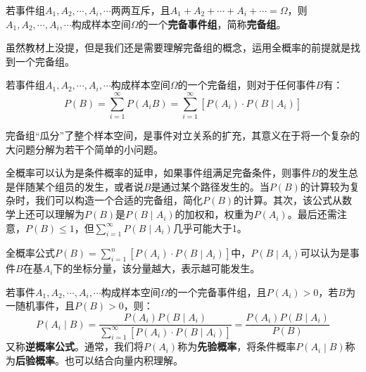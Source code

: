 \begin{definition}[完备事件组]
若事件组$A_1,A_2,\cdots ,A_i,\cdots $两两互斥，且$A_1+A_2+\cdots +A_i+\cdots =\varOmega $，则$A_1,A_2,\cdots ,A_i,\cdots $构成样本空间$\varOmega $的一个{\bf 完备事件组}，简称{\bf 完备组}。
\end{definition}

\begin{tcolorbox}
虽然教材上没提，但是我们还是需要理解完备组的概念，运用全概率的前提就是找到一个完备组。
\end{tcolorbox}

\begin{definition}[全概率公式]
若事件组$A_1,A_2,\cdots ,A_i,\cdots $构成样本空间$\varOmega $的一个完备组，则对于任何事件$B$有：
\[
P\left( B \right) =\sum_{i=1}^{\infty}{P\left( A_iB \right)}=\sum_{i=1}^{\infty}{\left[ P\left( A_i \right) \cdot P\left( B \middle| A_i \right) \right]}
\]
\end{definition}

完备组“瓜分”了整个样本空间，是事件对立关系的扩充，其意义在于将一个复杂的大问题分解为若干个简单的小问题。

全概率可以认为是条件概率的延申，如果事件组满足完备条件，则事件$B$的发生总是伴随某个组员的发生，或者说$B$是通过某个路径发生的。当$P\left( B \right) $的计算较为复杂时，我们可以构造一个合适的完备组，简化$P\left( B \right) $的计算。其次，该公式从数学上还可以理解为$P\left( B \right) $是$P\left( B \middle| A_i \right) $的加权和，权重为$P\left( A_i \right) $。最后还需注意，$P\left( B \right) \leqslant 1$，但$\sum_{i=1}^{\infty}{P\left( B \middle| A_i \right)}$几乎可能大于1。

\begin{tcolorbox}
全概率公式$P\left( B \right) =\sum_{i=1}^n{\left[ P\left( A_i \right) \cdot P\left( B \middle| A_i \right) \right]} $中，$P\left( B \middle| A_i \right) $可以认为是事件$B$在基$A_i$下的坐标分量，该分量越大，表示越可能发生。
\end{tcolorbox}

\begin{definition}[贝叶斯公式]
若事件$A_1,A_2,\cdots ,A_i,\cdots $构成样本空间$\varOmega $的一个完备事件组，且$P\left( A_i \right) >0$，若$B$为一随机事件，且$P\left( B \right) >0$，则：
\[
P\left( A_i \middle| B \right) =\frac{P\left( A_i \right) P\left( B \middle| A_i \right)}{\sum_{i=1}^{\infty}{\left[ P\left( A_i \right) \cdot P\left( B \middle| A_i \right) \right]}}=\frac{P\left( A_i \right) P\left( B \middle| A_i \right)}{P\left( B \right)}
\]
又称{\bf 逆概率公式}。通常，我们将$P\left( A_i \right) $称为{\bf 先验概率}，将条件概率$P\left( A_i \middle| B \right) $称为{\bf 后验概率}。也可以结合向量内积理解。
\end{definition}


